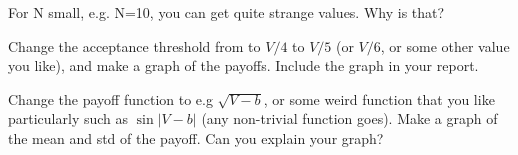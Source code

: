 \begin{exercise}
For N small, e.g. N=10, you can get quite strange values. Why is that?
\end{exercise}


\begin{exercise}
Change the acceptance threshold from to $V/4$ to $V/5$ (or $V/6$, or some other value you like), and make a graph of the payoffs.
Include the graph in your report.
\end{exercise}

\begin{exercise}
Change the payoff function to e.g $\sqrt{V-b}$, or some weird function that you like particularly such as $\sin |V-b|$ (any non-trivial function goes).
Make a graph of the  mean and std of the payoff. Can you explain your graph?
\end{exercise}
